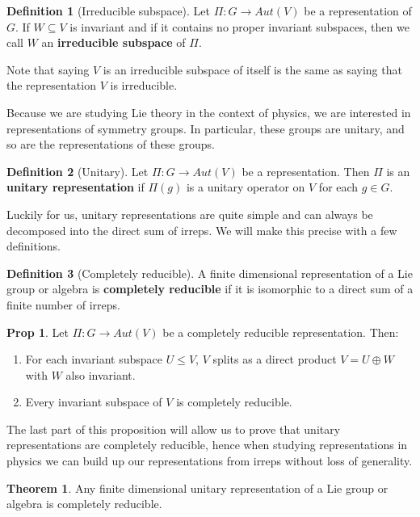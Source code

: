 \documentclass[11pt, oneside]{article}   	%
\theoremstyle{definition}
\newtheorem{definition}{Definition}[section]
\newtheorem{theorem}{Theorem}[section]
\newtheorem{prop}{Prop}[section]
\begin{document}
\begin{definition}[Irreducible subspace]
	Let $\Pi : G\rightarrow Aut(V)$ be a representation of $G$. If $W\subseteq V$ is invariant and if 
	it contains no proper invariant subspaces, then we call $W$ an \textbf{irreducible subspace} of 
	$\Pi$. 
\end{definition}

Note that saying $V$ is an irreducible subspace of itself is the same as saying that the representation $V$ 
is irreducible. 

Because we are studying Lie theory in the context of physics, we are interested in representations of 
symmetry groups. In particular, these groups are unitary, and so are the representations of these groups.
\begin{definition}[Unitary]
	Let $\Pi : G\rightarrow Aut(V)$ be a representation. Then $\Pi$ is an \textbf{unitary representation} if $\Pi(g)$ 
	is a unitary operator on $V$ for each $g\in G$. 
\end{definition}

Luckily for us, unitary representations are quite simple and can always be decomposed into the direct sum of irreps. 
We will make this precise with a few definitions.

\begin{definition}[Completely reducible]
	A finite dimensional representation of a Lie group or algebra is \textbf{completely reducible} if it is isomorphic 
	to a direct sum of a finite number of irreps. 
\end{definition}

\begin{prop}
	Let $\Pi : G\rightarrow Aut(V)$ be a completely reducible representation. Then:
	\begin{enumerate}
		\item For each invariant subspace $U\leq V$, $V$ splits as a direct product $V = U\oplus W$ with 
		$W$ also invariant. 
		\item Every invariant subspace of $V$ is completely reducible.
	\end{enumerate}
\end{prop}

The last part of this proposition will allow us to prove that unitary representations are completely reducible, hence 
when studying representations in physics we can build up our representations from irreps without loss of generality.

\begin{theorem}
	Any finite dimensional unitary representation of a Lie group or algebra is completely reducible.
\end{theorem}
\end{document}
